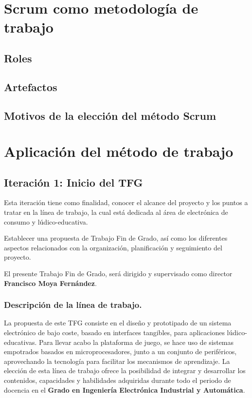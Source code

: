 \section{Scrum como metodología de trabajo}



\subsection{Roles}



\subsection{Artefactos}



\subsection{Motivos de la elección del método Scrum}



\section{Aplicación del método de trabajo}


\subsection{Iteración 1: Inicio del TFG}

Esta iteración tiene como finalidad, conocer el alcance del proyecto y los puntos a tratar en la línea de trabajo, la cual está dedicada al área de electrónica de consumo y lúdico-educativa. 

Establecer una propuesta de Trabajo Fin de Grado, así como los diferentes aspectos relacionados con la organización, planificación y seguimiento del proyecto.

El presente Trabajo Fin de Grado, será dirigido y supervisado como director \textbf{Francisco Moya Fernández}.

\subsubsection{Descripción de la línea de trabajo.}
La propuesta de este TFG consiste en el diseño y prototipado de un sistema electrónico de bajo coste, basado en interfaces tangibles, para aplicaciones lúdico-educativas. Para llevar acabo la plataforma de juego, se hace uso de sistemas empotrados basados en microprocesadores, junto a un conjunto de periféricos, aprovechando la tecnología para facilitar los mecanismos de aprendizaje.
La elección de esta línea de trabajo ofrece la posibilidad de integrar y desarrollar los contenidos, capacidades y habilidades adquiridas durante todo el periodo de docencia en el \textbf{Grado en Ingeniería Electrónica Industrial y Automática}.



